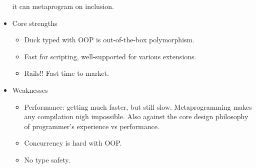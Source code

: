 \documentclass[10pt, twocolumn, landscape]{article}
\begin{document}
\begin{itemize}
        it can metaprogram on inclusion.
    \item Core strengths
        \begin{itemize}
            \item Duck typed with OOP is out-of-the-box polymorphism.
            \item Fast for scripting, well-supported for various extensions.
            \item Rails!! Fast time to market.
        \end{itemize}
    \item Weaknesses
        \begin{itemize}
            \item Performance: getting much faster, but still slow.
                Metaprogramming makes any compilation nigh impossible. Also
                against the core design philosophy of programmer's experience vs
                performance.
            \item Concurrency is hard with OOP.\@
            \item No type safety.
        \end{itemize}
\end{itemize}
\end{document}
